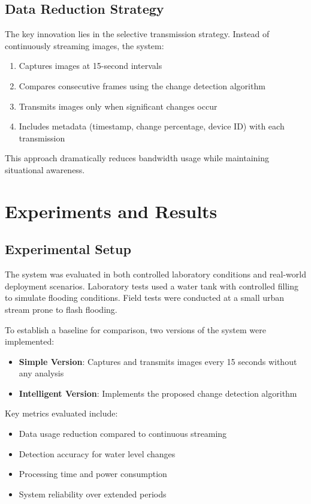 \documentclass[conference]{IEEEtran}
\begin{document}
\subsection{Data Reduction Strategy}

The key innovation lies in the selective transmission strategy. Instead of continuously streaming images, the system:
\begin{enumerate}
\item Captures images at 15-second intervals
\item Compares consecutive frames using the change detection algorithm
\item Transmits images only when significant changes occur
\item Includes metadata (timestamp, change percentage, device ID) with each transmission
\end{enumerate}

This approach dramatically reduces bandwidth usage while maintaining situational awareness.

\section{Experiments and Results}

\subsection{Experimental Setup}

The system was evaluated in both controlled laboratory conditions and real-world deployment scenarios. Laboratory tests used a water tank with controlled filling to simulate flooding conditions. Field tests were conducted at a small urban stream prone to flash flooding.

To establish a baseline for comparison, two versions of the system were implemented:
\begin{itemize}
\item \textbf{Simple Version}: Captures and transmits images every 15 seconds without any analysis
\item \textbf{Intelligent Version}: Implements the proposed change detection algorithm
\end{itemize}

Key metrics evaluated include:
\begin{itemize}
\item Data usage reduction compared to continuous streaming
\item Detection accuracy for water level changes
\item Processing time and power consumption
\item System reliability over extended periods
\end{itemize}
\end{document}
